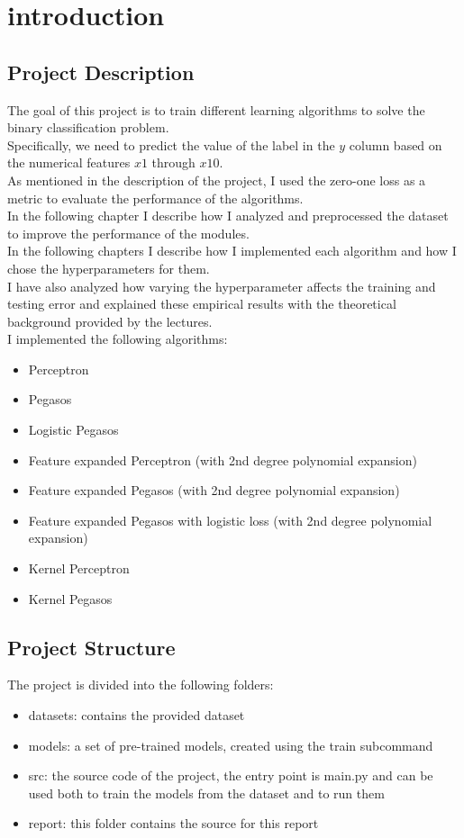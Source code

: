 \newpage
\section{introduction}
\subsection{Project Description}
The goal of this project is to train different learning algorithms to solve the binary classification problem.\\
Specifically, we need to predict the value of the label in the $y$ column based on the numerical features $x1$ through $x10$.\\
As mentioned in the description of the project, I used the zero-one loss as a metric to evaluate the performance of the algorithms.\\
In the following chapter I describe how I analyzed and preprocessed the dataset to improve the performance of the modules.\\
In the following chapters I describe how I implemented each algorithm and how I chose the hyperparameters for them.\\
I have also analyzed how varying the hyperparameter affects the training and testing error and explained these empirical results with the theoretical background provided by the lectures.\\

I implemented the following algorithms:
\begin{itemize}
\item Perceptron
\item Pegasos
\item Logistic Pegasos
\item Feature expanded Perceptron (with 2nd degree polynomial expansion)
\item Feature expanded Pegasos (with 2nd degree polynomial expansion)
\item Feature expanded Pegasos with logistic loss (with 2nd degree polynomial expansion)
\item Kernel Perceptron
\item Kernel Pegasos
\end{itemize}

\subsection{Project Structure}
The project is divided into the following folders:
\begin{itemize}
\item datasets: contains the provided dataset
\item models: a set of pre-trained models, created using the train subcommand
\item src: the source code of the project, the entry point is main.py and can be used both to train the models from the dataset and to run them
\item report: this folder contains the source for this report
\end{itemize}

